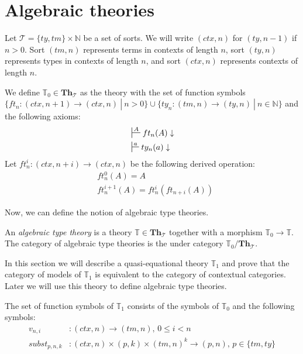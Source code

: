 \documentclass[reqno]{amsart}
\theoremstyle{definition}
\theoremstyle{remark}
\newcommand{\cat}[1]{\mathbf{#1}}
\newcommand{\Th}{\cat{Th}}
\newcommand{\ThT}{\Th_{\mathcal{T}}}
\numberwithin{figure}{section}
\begin{document}
\label{sec:T1}
\section{Algebraic theories}

Let $\mathcal{T} = \{ ty, tm \} \times \mathbb{N}$ be a set of sorts.
We will write $(ctx,n)$ for $(ty,n-1)$ if $n > 0$.
Sort $(tm,n)$ represents terms in contexts of length $n$, sort $(ty,n)$ represents types in contexts of length $n$, and sort $(ctx,n)$ represents contexts of length $n$.

We define $\mathbb{T}_0 \in \ThT$ as the theory with the set of function symbols $\{ ft_n : (ctx,n+1) \to (ctx,n)\ |\ n > 0 \} \cup \{ ty_n : (tm,n) \to (ty,n)\ |\ n \in \mathbb{N} \}$ and the following axioms:
\begin{align*}
& \sststile{}{A} ft_n(A) \downarrow \\
& \sststile{}{a} ty_n(a) \downarrow
\end{align*}
Let $ft^i_n : (ctx,n+i) \to (ctx,n)$ be the following derived operation:
\begin{align*}
& ft^0_n(A) = A \\
& ft^{i+1}_n(A) = ft^i_n(ft_{n+i}(A))
\end{align*}

Now, we can define the notion of algebraic type theories.

\begin{defn}
An \emph{algebraic type theory} is a theory $\mathbb{T} \in \ThT$ together with a morphism $\mathbb{T}_0 \to \mathbb{T}$.
The category of algebraic type theories is the under category $\mathbb{T}_0/\ThT$.
\end{defn}


In this section we will describe a quasi-equational theory $\mathbb{T}_1$ and prove that the category of models of $\mathbb{T}_1$ is equivalent to the category of contextual categories.
Later we will use this theory to define algebraic type theories.

The set of function symbols of $\mathbb{T}_1$ consists of the symbols of $\mathbb{T}_0$ and the following symbols:
\begin{align*}
v_{n,i}       & : (ctx,n) \to (tm,n) \text{, } 0 \leq i < n \\
subst_{p,n,k} & : (ctx,n) \times (p,k) \times (tm,n)^k \to (p,n) \text{, } p \in \{ tm, ty \}
\end{align*}
\end{document}
